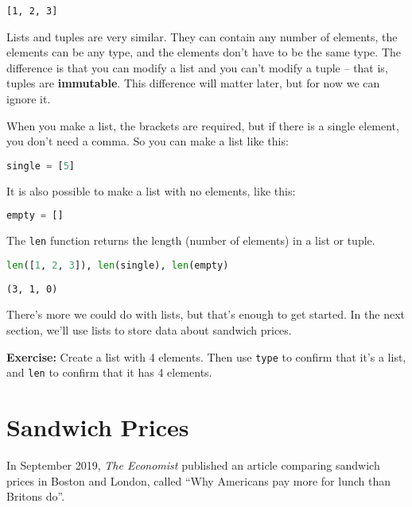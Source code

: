 \begin{lstlisting}[style=output]
[1, 2, 3]
\end{lstlisting}

Lists and tuples are very similar. They can contain any number of
elements, the elements can be any type, and the elements don't have to
be the same type. The difference is that you can modify a list and you
can't modify a tuple -- that is, tuples are \textbf{immutable}. This
difference will matter later, but for now we can ignore it.

When you make a list, the brackets are required, but if there is a
single element, you don't need a comma. So you can make a list like
this:

\begin{lstlisting}[language=Python,style=source]
single = [5]
\end{lstlisting}

It is also possible to make a list with no elements, like this:

\begin{lstlisting}[language=Python,style=source]
empty = []
\end{lstlisting}

The \passthrough{\lstinline!len!} function returns the length (number of
elements) in a list or tuple.

\begin{lstlisting}[language=Python,style=source]
len([1, 2, 3]), len(single), len(empty)
\end{lstlisting}

\begin{lstlisting}[style=output]
(3, 1, 0)
\end{lstlisting}

There's more we could do with lists, but that's enough to get started.
In the next section, we'll use lists to store data about sandwich
prices.

\textbf{Exercise:} Create a list with 4 elements. Then use
\passthrough{\lstinline!type!} to confirm that it's a list, and
\passthrough{\lstinline!len!} to confirm that it has 4 elements.

\section{Sandwich Prices}\label{sandwich-prices}

In September 2019, \emph{The Economist} published an article comparing
sandwich prices in Boston and London, called ``Why Americans pay more
for lunch than Britons do''.

